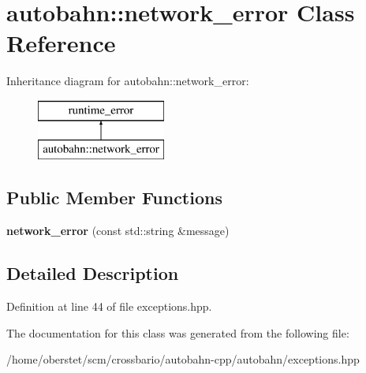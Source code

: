 \hypertarget{classautobahn_1_1network__error}{}\section{autobahn\+:\+:network\+\_\+error Class Reference}
\label{classautobahn_1_1network__error}
Inheritance diagram for autobahn\+:\+:network\+\_\+error\+:\begin{figure}[H]
\begin{center}
\leavevmode
\includegraphics[height=2.000000cm]{classautobahn_1_1network__error}
\end{center}
\end{figure}
\subsection*{Public Member Functions}
\begin{DoxyCompactItemize}
\item 
{\bfseries network\+\_\+error} (const std\+::string \&message)\hypertarget{classautobahn_1_1network__error_af9986124fda16649efc93e0037deb630}{}\label{classautobahn_1_1network__error_af9986124fda16649efc93e0037deb630}

\end{DoxyCompactItemize}


\subsection{Detailed Description}


Definition at line 44 of file exceptions.\+hpp.



The documentation for this class was generated from the following file\+:\begin{DoxyCompactItemize}
\item 
/home/oberstet/scm/crossbario/autobahn-\/cpp/autobahn/exceptions.\+hpp\end{DoxyCompactItemize}
